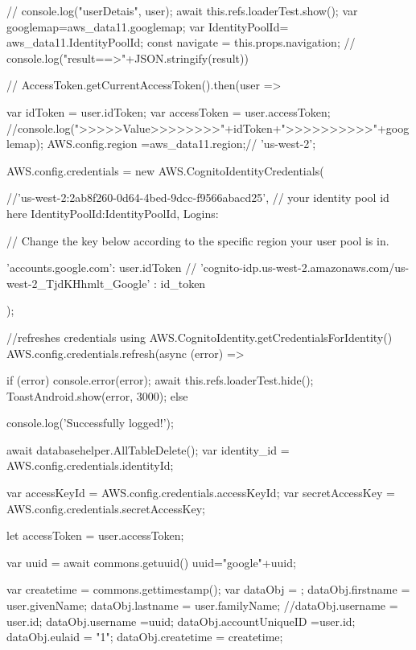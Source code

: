 {{{{{{        // console.log("userDetais", user);
       await this.refs.loaderTest.show();
       var googlemap=aws_data11.googlemap;
       var IdentityPoolId= aws_data11.IdentityPoolId;
       const { navigate } = this.props.navigation;
        // console.log("result==>"+JSON.stringify(result))
        
        //     AccessToken.getCurrentAccessToken().then(user => {
        var idToken = user.idToken;
        var accessToken = user.accessToken;
        //console.log(">>>>>Value>>>>>>>>"+idToken+">>>>>>>>>>"+googlemap);
        AWS.config.region =aws_data11.region;// 'us-west-2';
          
        AWS.config.credentials = new AWS.CognitoIdentityCredentials({
           //'us-west-2:2ab8f260-0d64-4bed-9dcc-f9566abacd25', // your identity pool id here
          IdentityPoolId:IdentityPoolId,
          Logins: {
            // Change the key below according to the specific region your user pool is in.
            
            'accounts.google.com': user.idToken
            // 'cognito-idp.us-west-2.amazonaws.com/us-west-2_TjdKHhmlt_Google' : id_token
          }
        });
        
        //refreshes credentials using AWS.CognitoIdentity.getCredentialsForIdentity()
        AWS.config.credentials.refresh(async (error) => {
          if (error) {
            console.error(error);
            await this.refs.loaderTest.hide();
            ToastAndroid.show(error, 3000);
          } else {

            console.log('Successfully logged!');

            await databasehelper.AllTableDelete();
            var identity_id = AWS.config.credentials.identityId;
           
            var accessKeyId = AWS.config.credentials.accessKeyId;
            var secretAccessKey = AWS.config.credentials.secretAccessKey;
           

            let accessToken = user.accessToken;
           
            var uuid = await commons.getuuid()
                uuid="google"+uuid;


            var createtime = commons.gettimestamp();
            var dataObj = {};
            dataObj.firstname = user.givenName;
            dataObj.lastname = user.familyName;
            //dataObj.username = user.id;
            dataObj.username =uuid;
            dataObj.accountUniqueID =user.id;
            dataObj.eulaid = "1";
            dataObj.createtime = createtime;

}}}}}}}}}

